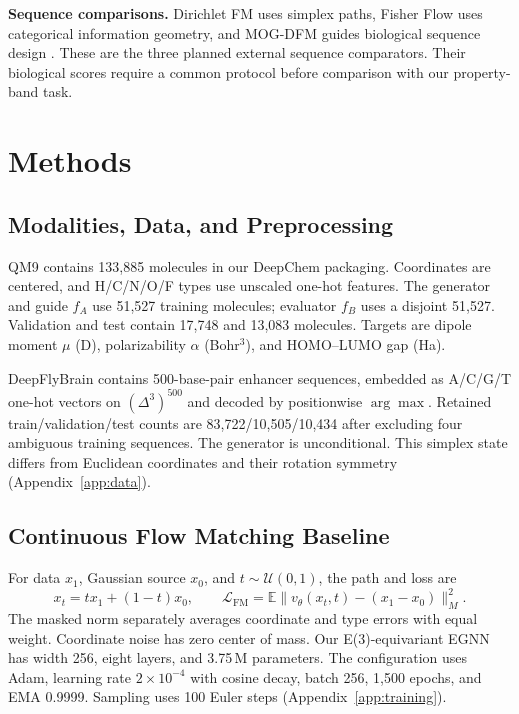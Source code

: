 \documentclass{article}
\begin{document}
\textbf{Sequence comparisons.} Dirichlet FM uses simplex paths, Fisher Flow uses categorical information geometry, and MOG-DFM guides biological sequence design \citep{stark2024dirichlet,davis2024fisher,chen2025multi}. These are the three planned external sequence comparators. Their biological scores require a common protocol before comparison with our property-band task.

\section{Methods}
\subsection{Modalities, Data, and Preprocessing}\label{sec:data}
QM9 \citep{ramakrishnan2014qm9} contains 133{,}885 molecules in our DeepChem packaging. Coordinates are centered, and H/C/N/O/F types use unscaled one-hot features. The generator and guide $f_A$ use 51{,}527 training molecules; evaluator $f_B$ uses a disjoint 51{,}527. Validation and test contain 17{,}748 and 13{,}083 molecules. Targets are dipole moment $\mu$ (D), polarizability $\alpha$ (Bohr$^3$), and HOMO--LUMO gap (Ha).

DeepFlyBrain \citep{stark2024dirichlet} contains 500-base-pair enhancer sequences, embedded as A/C/G/T one-hot vectors on $(\Delta^3)^{500}$ and decoded by positionwise $\arg\max$. Retained train/validation/test counts are 83{,}722/10{,}505/10{,}434 after excluding four ambiguous training sequences. The generator is unconditional. This simplex state differs from Euclidean coordinates and their rotation symmetry (Appendix~\ref{app:data}).

\subsection{Continuous Flow Matching Baseline}\label{sec:fm}
For data $x_1$, Gaussian source $x_0$, and $t\sim\mathcal U(0,1)$, the path and loss are
\begin{equation}
x_t=t x_1+(1-t)x_0,\qquad
\mathcal L_{\mathrm{FM}}=\mathbb E\|v_\theta(x_t,t)-(x_1-x_0)\|_M^2.
\label{eq:fm}
\end{equation}
The masked norm separately averages coordinate and type errors with equal weight. Coordinate noise has zero center of mass. Our E(3)-equivariant EGNN has width 256, eight layers, and 3.75\,M parameters. The configuration uses Adam, learning rate $2\times10^{-4}$ with cosine decay, batch 256, 1{,}500 epochs, and EMA 0.9999. Sampling uses 100 Euler steps (Appendix~\ref{app:training}).
\end{document}
